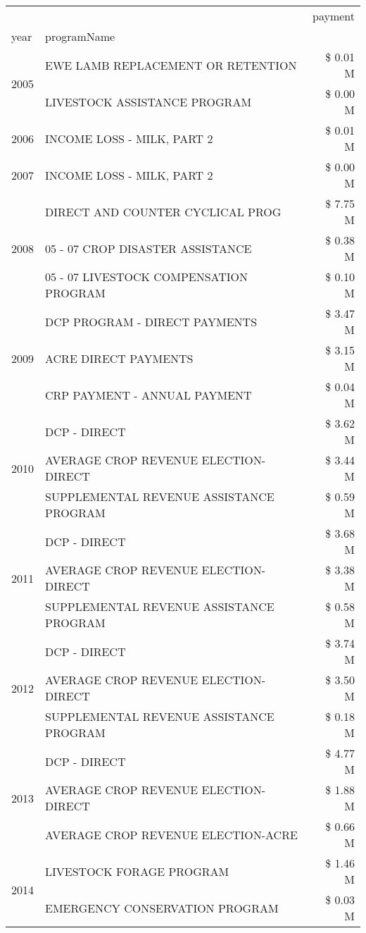 \begin{tabular}{llr}
\toprule
 &  & payment \\
year & programName &  \\
\midrule
\multirow[t]{2}{*}{2005} & EWE LAMB REPLACEMENT OR RETENTION & \$ 0.01 M \\
 & LIVESTOCK ASSISTANCE PROGRAM & \$ 0.00 M \\
\cline{1-3}
2006 & INCOME LOSS - MILK, PART 2 & \$ 0.01 M \\
\cline{1-3}
2007 & INCOME LOSS - MILK, PART 2 & \$ 0.00 M \\
\cline{1-3}
\multirow[t]{3}{*}{2008} & DIRECT AND COUNTER CYCLICAL PROG & \$ 7.75 M \\
 & 05 - 07 CROP DISASTER ASSISTANCE & \$ 0.38 M \\
 & 05 - 07 LIVESTOCK COMPENSATION PROGRAM & \$ 0.10 M \\
\cline{1-3}
\multirow[t]{3}{*}{2009} & DCP PROGRAM - DIRECT PAYMENTS & \$ 3.47 M \\
 & ACRE DIRECT PAYMENTS & \$ 3.15 M \\
 & CRP PAYMENT - ANNUAL PAYMENT & \$ 0.04 M \\
\cline{1-3}
\multirow[t]{3}{*}{2010} & DCP - DIRECT & \$ 3.62 M \\
 & AVERAGE CROP REVENUE ELECTION-DIRECT & \$ 3.44 M \\
 & SUPPLEMENTAL REVENUE ASSISTANCE PROGRAM & \$ 0.59 M \\
\cline{1-3}
\multirow[t]{3}{*}{2011} & DCP - DIRECT & \$ 3.68 M \\
 & AVERAGE CROP REVENUE ELECTION-DIRECT & \$ 3.38 M \\
 & SUPPLEMENTAL REVENUE ASSISTANCE PROGRAM & \$ 0.58 M \\
\cline{1-3}
\multirow[t]{3}{*}{2012} & DCP - DIRECT & \$ 3.74 M \\
 & AVERAGE CROP REVENUE ELECTION-DIRECT & \$ 3.50 M \\
 & SUPPLEMENTAL REVENUE ASSISTANCE PROGRAM & \$ 0.18 M \\
\cline{1-3}
\multirow[t]{3}{*}{2013} & DCP - DIRECT & \$ 4.77 M \\
 & AVERAGE CROP REVENUE ELECTION-DIRECT & \$ 1.88 M \\
 & AVERAGE CROP REVENUE ELECTION-ACRE & \$ 0.66 M \\
\cline{1-3}
\multirow[t]{3}{*}{2014} & LIVESTOCK FORAGE PROGRAM & \$ 1.46 M \\
 & EMERGENCY CONSERVATION PROGRAM & \$ 0.03 M \\

\end{tabular}
